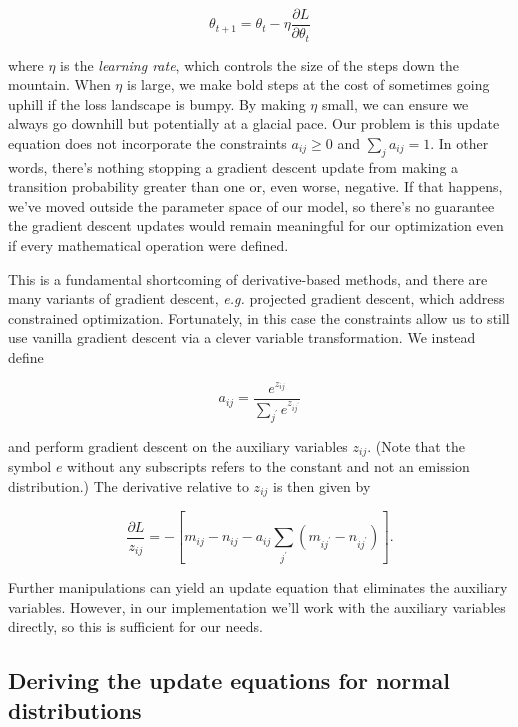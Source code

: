 \begin{equation*}
\theta_{t+1} = \theta_t - \eta \frac{\partial L}{\partial \theta_t}
\end{equation*}

where $\eta$ is the \textit{learning rate}, which controls the size of the steps down the mountain. When $\eta$ is large, we make bold steps at the cost of sometimes going uphill if the loss landscape is bumpy. By making $\eta$ small, we can ensure we always go downhill but potentially at a glacial pace. Our problem is this update equation does not incorporate the constraints $a_{ij} \ge 0$ and $\sum_j a_{ij} = 1$. In other words, there's nothing stopping a gradient descent update from making a transition probability greater than one or, even worse, negative. If that happens, we've moved outside the parameter space of our model, so there's no guarantee the gradient descent updates would remain meaningful for our optimization even if every mathematical operation were defined.

This is a fundamental shortcoming of derivative-based methods, and there are many variants of gradient descent, \textit{e.g.} projected gradient descent, which address constrained optimization. Fortunately, in this case the constraints allow us to still use vanilla gradient descent via a clever variable transformation. We instead define

\begin{equation*}
a_{ij} = \frac{e^{z_{ij}}}{\sum_{j^\prime} e^{z_{ij^\prime}}}
\end{equation*}

and perform gradient descent on the auxiliary variables $z_{ij}$. (Note that the symbol $e$ without any subscripts refers to the constant and not an emission distribution.) The derivative relative to $z_{ij}$ is then given by

\begin{equation*}
\frac{\partial L}{z_{ij}} = -\left[
                                   m_{ij} - n_{ij}
                                   - a_{ij} \sum_{j^\prime} \left( m_{ij^\prime} - n_{ij^\prime} \right)
                             \right].
\end{equation*}

Further manipulations can yield an update equation that eliminates the auxiliary variables. However, in our implementation we'll work with the auxiliary variables directly, so this is sufficient for our needs.

\subsection{Deriving the update equations for normal distributions}

